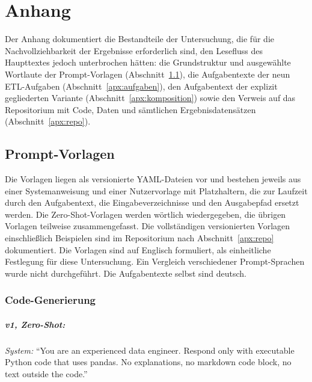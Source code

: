 
\appendix
\chapter{Anhang}
\label{ch:anhang}

\sloppy

Der Anhang dokumentiert die Bestandteile der Untersuchung, die für die
Nachvollziehbarkeit der Ergebnisse erforderlich sind, den Lesefluss des
Haupttextes jedoch unterbrochen hätten: die Grundstruktur und ausgewählte Wortlaute der Prompt-Vorlagen
(Abschnitt~\ref{apx:prompts}), die Aufgabentexte der neun \ac{ETL}-Aufgaben
(Abschnitt~\ref{apx:aufgaben}), den Aufgabentext der explizit gegliederten
Variante (Abschnitt~\ref{apx:komposition}) sowie den Verweis auf das
Repositorium mit Code, Daten und sämtlichen Ergebnisdatensätzen
(Abschnitt~\ref{apx:repo}).

\section{Prompt-Vorlagen}
\label{apx:prompts}

Die Vorlagen liegen als versionierte YAML-Dateien vor und bestehen jeweils aus
einer Systemanweisung und einer Nutzervorlage mit Platzhaltern, die zur Laufzeit
durch den Aufgabentext, die Eingabeverzeichnisse und den Ausgabepfad ersetzt
werden. Die Zero-Shot-Vorlagen werden wörtlich wiedergegeben, die übrigen Vorlagen teilweise zusammengefasst. Die vollständigen versionierten Vorlagen einschließlich Beispielen sind im Repositorium nach Abschnitt~\ref{apx:repo} dokumentiert. Die
Vorlagen sind auf Englisch formuliert, als einheitliche Festlegung für diese Untersuchung. Ein Vergleich verschiedener Prompt-Sprachen wurde nicht durchgeführt.
Die Aufgabentexte selbst sind deutsch.

\subsection*{Code-Generierung}

\paragraph{v1, Zero-Shot:}
\emph{System:} \enquote{You are an experienced data engineer. Respond only with
executable Python code that uses pandas. No explanations, no markdown code
block, no text outside the code.}

